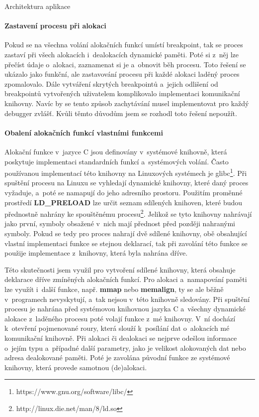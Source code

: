 \documentclass[czech,bachelor,male,python,dept460,hidelinks]{diploma}						%
\newcommand{\parspace}[1][]{
	\ifthenelse{\isempty{#1}}{\vspace{0mm}}{\vspace{#1}}
	\par
}
\begin{document}
\begin{section}{Architektura aplikace}
				\paragraph*{Zastavení procesu při alokaci} Pokud se na všechna volání alokačních funkcí umístí breakpoint, tak se proces zastaví při všech alokacích
				i~dealokacích dynamické paměti. Poté si z~něj lze přečíst údaje o~alokaci, zaznamenat si je a~obnovit běh procesu. Toto řešení se ukázalo jako funkční,
				ale zastavování procesu při každé alokaci laděný proces zpomalovalo. Dále vytváření skrytých breakpointů a~jejich odlišení od breakpointů vytvořených
				uživatelem komplikovalo implementaci komunikační knihovny. Navíc by se tento způsob zachytávání musel
				implementovat pro každý debugger zvlášť. Kvůli těmto důvodům jsem se rozhodl toto řešení nepoužít.
				
				\paragraph*{Obalení alokačních funkcí vlastními funkcemi} Alokační funkce v~jazyce C jsou definovány v~systémové knihovně, která poskytuje
				implementaci standardních funkcí a~systémových volání. Často používanou implementací této knihovny na Linuxových systémech je
				glibc\footnote{https://www.gnu.org/software/libc/}. Při spuštění procesu na Linuxu se vyhledají dynamické knihovny, které daný proces vyžaduje,
				a~poté se namapují do jeho adresního prostoru. Použitím proměnné prostředí \textbf{LD\_PRELOAD} lze určit
				seznam sdílených knihoven, které budou přednostně nahrány ke spouštěnému procesu\footnote{http://linux.die.net/man/8/ld.so}.
				Jelikož se tyto knihovny nahrávají jako první, symboly obsažené v~nich mají přednost před později nahranými symboly. Pokud se tedy pro proces
				nahrají dvě sdílené knihovny, obě obsahující vlastní implementaci funkce se stejnou deklarací, tak při zavolání této funkce se použije
				implementace z~knihovny, která byla nahrána dříve.
				
				\parspace Této skutečnosti jsem využil pro vytvoření sdílené knihovny, která obsahuje deklarace dříve zmíněných alokačních funkcí.
				Pro alokaci a~namapování paměti lze využít i~další funkce, např. \textbf{mmap} nebo \textbf{memalign}, ty se ale běžně v~programech
				nevyskytují, a~tak nejsou v~této knihovně sledovány.
				Při spuštění procesu je nahrána před systémovou knihovnou jazyka C a~všechny dynamické alokace z~laděného procesu poté volají funkce z~mé knihovny.
				V~ní dochází k~otevření pojmenované roury, která slouží k~posílání dat o~alokacích mé komunikační knihovně.
				Při alokaci či dealokaci se nejprve odešlou informace o~jejím typu a~případné další parametry, jako je velikost alokovaných dat
				nebo adresa dealokované paměti. Poté je zavolána původní funkce ze systémové knihovny, která provede samotnou (de)alokaci.
				

\end{section}
\end{document}
